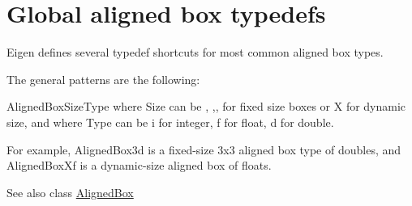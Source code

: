 \hypertarget{group__alignedboxtypedefs}{}\section{Global aligned box typedefs}
\label{group__alignedboxtypedefs}
Eigen defines several typedef shortcuts for most common aligned box types.

The general patterns are the following\+:

{\ttfamily Aligned\+Box\+Size\+Type} where {\ttfamily Size} can be {}, {},{},{} for fixed size boxes or {\ttfamily X} for dynamic size, and where {\ttfamily Type} can be {\ttfamily i} for integer, {\ttfamily f} for float, {\ttfamily d} for double.

For example, {\ttfamily Aligned\+Box3d} is a fixed-\/size 3x3 aligned box type of doubles, and {\ttfamily Aligned\+Box\+Xf} is a dynamic-\/size aligned box of floats.

\begin{DoxySeeAlso}{See also}
class \mbox{\hyperlink{class_eigen_1_1_aligned_box}{Aligned\+Box}} 
\end{DoxySeeAlso}
